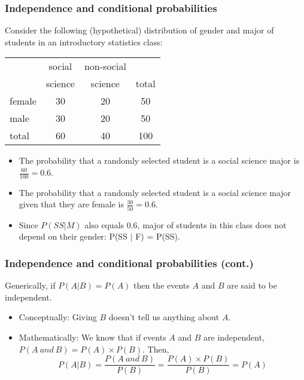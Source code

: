 \documentclass[slidestop,compress,mathserif]{beamer}
\begin{document}
\begin{frame}
\frametitle{Independence and conditional probabilities}

Consider the following (hypothetical) distribution of gender and major of students in an introductory statistics class:

{\small
\begin{center}
\begin{tabular}{l | c c | c}
			& social	& non-social 		&  \\
			& science	& science	& total \\
\hline
female		& 30		& 20		& 50 \\
male			& 30		& 20		& 50 \\
\hline
total			& 60		& 40		& 100
\end{tabular}
\end{center}
}

\pause

\begin{itemize}

\item The probability that a randomly selected student is a social science major is \pause $\frac{60}{100} = 0.6$. 

\pause

\item The probability that a randomly selected student is a social science major given that they are female is \pause $\frac{30}{50} = 0.6$. 

\pause

\item Since $P(SS | M)$ also equals 0.6, major of students in this class does not depend on their gender: P(SS $|$ F) = P(SS).

\end{itemize}

\end{frame}


\begin{frame}
\frametitle{Independence and conditional probabilities (cont.)}

Generically, if $P(A|B) = P(A)$ then the events $A$ and $B$ are said to be independent.

\pause

\begin{itemize}

\item Conceptually: Giving $B$ doesn't tell us anything about $A$.

\pause

\item Mathematically: We know that if events $A$ and $B$ are independent, $P(A~and~B) = P(A) \times P(B)$. Then,
\[ P(A|B) = \frac{P(A~and~B)}{P(B)} = \frac{P(A) \times P(B)}{P(B)} = P(A) \]

\end{itemize}

\end{frame}
\end{document}
